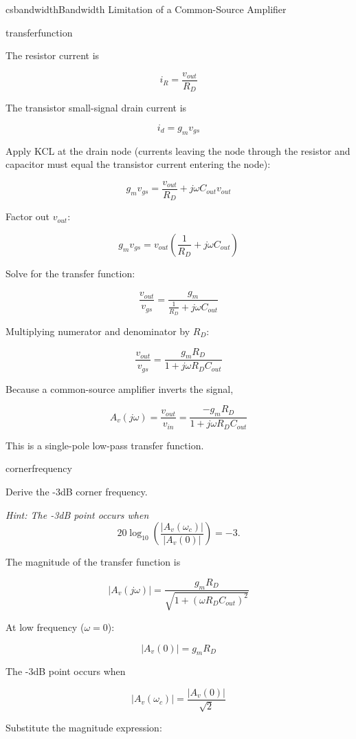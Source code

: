 \begin{mainquestion}{csbandwidth}{Bandwidth Limitation of a Common-Source Amplifier}
\begin{partquestion}{transferfunction}
\begin{answer}[2.5in]
The resistor current is

\[
i_R = \frac{v_{out}}{R_D}
\]

The transistor small-signal drain current is

\[
i_d = g_m v_{gs}
\]

Apply KCL at the drain node (currents leaving the node through the resistor and capacitor must equal the transistor current entering the node):

\[
g_m v_{gs}
=
\frac{v_{out}}{R_D}
+
j\omega C_{out} v_{out}
\]

Factor out \(v_{out}\):

\[
g_m v_{gs}
=
v_{out}
\left(
\frac{1}{R_D}
+
j\omega C_{out}
\right)
\]

Solve for the transfer function:

\[
\frac{v_{out}}{v_{gs}}
=
\frac{g_m}
{
\frac{1}{R_D}+j\omega C_{out}
}
\]

Multiplying numerator and denominator by \(R_D\):

\[
\frac{v_{out}}{v_{gs}}
=
\frac{g_m R_D}{1+j\omega R_D C_{out}}
\]

Because a common-source amplifier inverts the signal,

\[
A_v(j\omega)
=
\frac{v_{out}}{v_{in}}
=
\frac{-g_m R_D}{1+j\omega R_D C_{out}}
\]

This is a single-pole low-pass transfer function.
\end{answer}

\pagebreak
\end{partquestion}

\begin{partquestion}{cornerfrequency}
{Derive the -3dB corner frequency.

\textit{Hint: The -3dB point occurs when}
\[
20 \log_{10} \left( \frac{|A_v(\omega_c)|}{|A_v(0)|} \right) = -3.
\]}

\begin{answer}[2.5in]
The magnitude of the transfer function is

\[
|A_v(j\omega)|
=
\frac{g_m R_D}
{\sqrt{1+(\omega R_D C_{out})^2}}
\]

At low frequency (\(\omega=0\)):

\[
|A_v(0)| = g_m R_D
\]

The -3dB point occurs when

\[
|A_v(\omega_c)|
=
\frac{|A_v(0)|}{\sqrt{2}}
\]

Substitute the magnitude expression:


\end{answer}
\end{partquestion}
\end{mainquestion}
